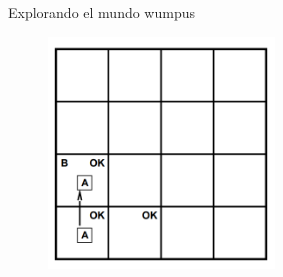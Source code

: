     \begin{frame}{Explorando el mundo wumpus}
        \begin{figure}\includegraphics[width =60mm]{14img-cap7.PNG}\end{figure}
    \end{frame}